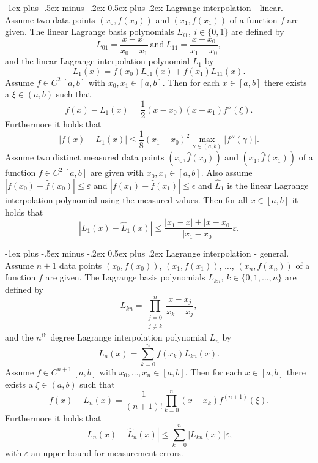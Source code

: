 \documentclass[10pt,landscape,a4paper]{article}
\makeatletter
\renewcommand{\section}{\@startsection{section}{1}{0mm}%
	{-1ex plus -.5ex minus -.2ex}%
	{0.5ex plus .2ex}%
	{\normalfont\large\bfseries}}
\makeatother
\begin{document}
\begin{multicols}{3}
		\section{Lagrange interpolation - linear.}
		Assume two data points $ (x_0,f(x_0)) $ and $ (x_1,f(x_1)) $ of a function $ f $ are given. The linear Lagrange basis polynomials $ L_{i1}, \ i\in\{0,1\} $ are defined by
		\[
			L_{01}=\frac{x-x_1}{x_0-x_1}\ \text{and}\ L_{11}=\frac{x-x_0}{x_1-x_0},
		\]
		and the linear Lagrange interpolation polynomial $ L_1 $ by
		\[
			L_1(x) = f(x_0)L_{01}(x)+f(x_1)L_{11}(x).
		\]
		Assume $ f\in C^2\,[a,b] $ with $ x_0,x_1\in[a,b] $. Then for each $ x\in[a,b] $ there exists a $ \xi\in(a,b) $ such that
		\[
			f(x)-L_1(x)=\frac{1}{2}(x-x_0)(x-x_1)f''(\xi).
		\]
		Furthermore it holds that
		\[
			|f(x)-L_1(x)|\leq\frac{1}{8}(x_1-x_0)^2\underset{\gamma\in(a,b)}{\max}|f''(\gamma)|.
		\]
		Assume two distinct measured data points $ (x_0,\hat{f}(x_0)) $ and $ (x_1,\hat{f}(x_1)) $ of a function $ f\in C^2\,[a,b] $ are given with $ x_0,x_1\in[a,b] $.
		Also assume $ |f(x_0)-\hat{f}(x_0)|\leq\varepsilon $ and $ |f(x_1)-\hat{f}(x_1)|\leq\epsilon $ and $ \hat{L}_1 $ is the linear Lagrange interpolation polynomial using the measured values.
		Then for all $ x\in[a,b] $ it holds that
		\[
			|L_1(x)-\hat{L}_1(x)|\leq\frac{|x_1-x|+|x-x_0|}{|x_1-x_0|}\varepsilon.
		\]
		
		\section{Lagrange interpolation - general.}
		Assume $ n+1 $ data points $ (x_0,f(x_0)) $, $ (x_1,f(x_1)) $, $ \ldots $, $ (x_n,f(x_n)) $ of a function $ f $ are given. The Lagrange basis polynomials $ L_{kn} $, $ k\in \{0,1,\ldots,n\} $ are defined by
		\[
			L_{kn} = \prod_{\substack{j=0\\j\neq k}}^{n} \frac{x-x_j}{x_k-x_j},
		\]
		and the $ n^\text{th} $ degree Lagrange interpolation polynomial $ L_n $ by
		\[
			L_n(x) = \sum_{k=0}^{n}f(x_k)L_{kn}(x).
		\]
		Assume $ f\in C^{n+1}\,[a,b] $ with $ x_0,\hdots,x_n\in[a,b] $.
		Then for each $ x\in[a,b] $ there exists a $ \xi\in(a,b) $ such that
		\[
			f(x)-L_n(x)=\frac{1}{(n+1)!}\prod_{k=0}^{n}(x-x_k)f^{(n+1)}(\xi).
		\]
		Furthermore it holds that
		\[
			|L_n(x)-\hat{L}_n(x)|\leq\sum_{k=0}^{n}|L_{kn}(x)|\varepsilon,
		\]
		with $ \varepsilon $ an upper bound for measurement errors.
		

\end{multicols}
\end{document}
